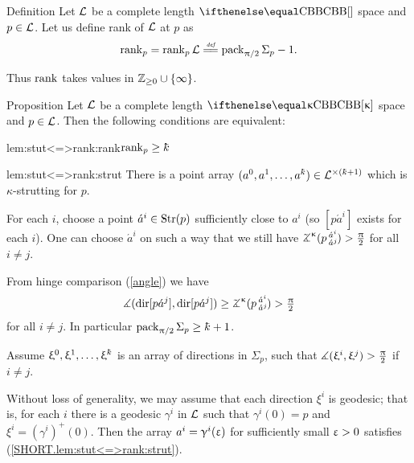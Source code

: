 \begin{thm}{Definition}\label{def:rank}
Let $\mathcal{L}$ be a complete length $\Alex{}$ space
and $p\in \spc{L}$.
Let us define rank of $\mathcal{L}$ at $p$ as 
\[\rank_p=\rank_p\spc{L}
\df\pack_{\pi/2}\Sigma_p-1.\]

\end{thm}




Thus $\mathop{\rm rank}\nolimits$ takes values in $\ZZ_{\ge0}\cup\{\infty\}$.


\begin{thm}{Proposition}\label{prop:stutt}
Let $\mathcal{L}$ be a complete length $\Alex{\kappa}$ space 
and $p\in \spc{L}$.
Then the following conditions are equivalent:

\begin{subthm}{lem:stut<=>rank:rank}$\rank_p\ge\kay$
\end{subthm}

\begin{subthm}{lem:stut<=>rank:strut}
There is a point array $(a^0,a^1,\dots,a^\kay)\in\spc{L}^{{\times}(\kay+1)}$ which is $\kappa$-strutting for $p$.
\end{subthm}
\end{thm}

For each $i$,
choose a point $\acute a^i\in\Str(p)$ sufficiently close to $a^i$ (so $[p\acute a^i]$ exists for each $i$).
One can choose $\acute a^i$ on such a way that we still have
$\angk\kappa{p}{\acute a^i}{\acute a^j}>\tfrac\pi2$ for all $i\not=j$.

From hinge comparison (\ref{angle}) we have 
\[\mangle(\dir{p}{\acute a^j},\dir{p}{\acute a^j})
\ge
\angk\kappa{p}{\acute a^i}{\acute a^j}
>
\tfrac\pi2\]
for all $i\not=j$.
In particular $\pack_{\pi/2}\Sigma_p\ge \kay+1$.

Assume $\xi^0,\xi^1,\dots,\xi^\kay$ is an array of directions in $\Sigma_p$, such that $\measuredangle(\upxi^i,\upxi^j)>\tfrac{\uppi}2$ if $i\not=j$.

Without loss of generality, 
we may assume that each direction $\xi^i$ is geodesic;
that is, for each $i$ there is a geodesic $\gamma^i$ in $\mathcal{L}$ such that $\gamma^i(0)=p$ and $\xi^i=(\gamma^i)^+(0)$.
Then the array $a^i=\upgamma^i(\upvarepsilon)$ for sufficiently small $\upvarepsilon>0$
satisfies (\ref{SHORT.lem:stut<=>rank:strut}).
\qeds


